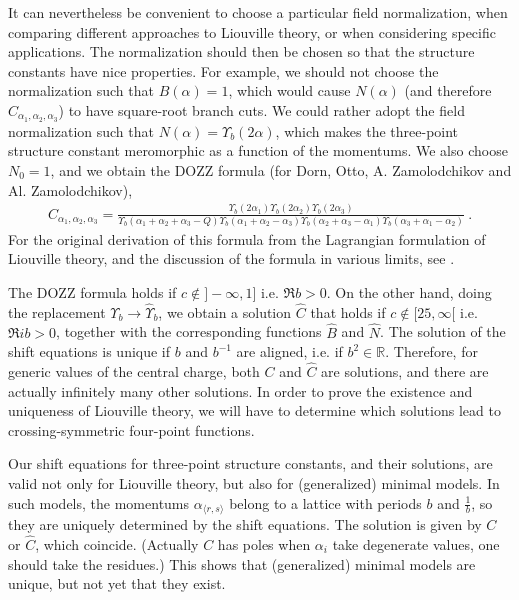 \documentclass[12pt, a4paper]{article}
\theoremstyle{break}
\begin{document}
It can nevertheless be convenient to choose a particular field normalization, when comparing different approaches to Liouville theory, or when considering specific applications.
The normalization should then be chosen so that the structure constants have nice properties. 
For example, we should not choose 
the normalization such that $B(\alpha)=1$, which would cause $N(\alpha)$ (and therefore $C_{\alpha_1,\alpha_2,\alpha_3}$) to have square-root branch cuts.
We could rather adopt the field normalization such that $N(\alpha)=\Upsilon_b(2\alpha)$, which makes the three-point structure constant meromorphic as a function of the momentums.
We also choose $N_0=1$, and  
we obtain the DOZZ formula (for Dorn, Otto, A.
Zamolodchikov and Al. Zamolodchikov),
\begin{align}
 C_{\alpha_1,\alpha_2,\alpha_3} =  \frac{\Upsilon_b(2\alpha_1) \Upsilon_b(2\alpha_2) \Upsilon_b(2\alpha_3)}{\Upsilon_b(\alpha_1+\alpha_2+\alpha_3-Q) \Upsilon_b(\alpha_1+\alpha_2-\alpha_3)\Upsilon_b(\alpha_2+\alpha_3-\alpha_1)\Upsilon_b(\alpha_3+\alpha_1-\alpha_2)} \ .
\label{caaa}
\end{align}
For the original derivation of this formula from the Lagrangian formulation of Liouville theory, and the discussion of the formula in various limits, see \cite{zz95}.

The DOZZ formula holds if
$c\notin ]-\infty, 1]$ i.e. $\Re b>0$. 
On the other hand, doing the replacement $\Upsilon_b\to \hat\Upsilon_b$, we obtain a solution $\hat C$ that holds if  $c\notin [25,\infty[$ i.e. $\Re ib>0$, together with the corresponding functions $\hat B$ and $\hat N$.
The solution of the shift equations is unique if $b$ and $b^{-1}$ are aligned, i.e. if $b^2\in\mathbb{R}$. Therefore, for generic values of the central charge, both $C$ and $\hat C$ are solutions, and there are actually infinitely many other solutions. In order to prove the existence and uniqueness of Liouville theory, we will have to determine which solutions lead to crossing-symmetric four-point functions.

Our shift equations for three-point structure constants, and their solutions, are valid not only for Liouville theory, but also for (generalized) minimal models. In such models, the momentums $\alpha_{\langle r,s\rangle}$ belong to a lattice with periods $b$ and $\frac{1}{b}$, so they are uniquely determined by the shift equations. The solution is given by $C$ or $\hat C$, which coincide. (Actually $C$ has poles when $\alpha_i$ take degenerate values, one should take the residues.) This shows that (generalized) minimal models are unique, but not yet that they exist.
\end{document}
